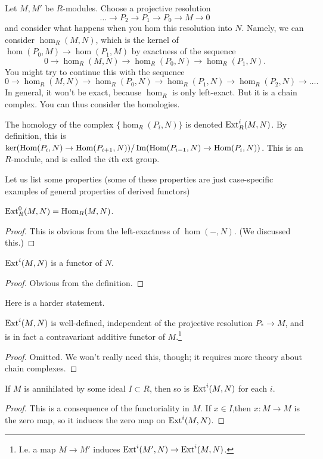 Let $M, M'$ be $R$-modules. Choose a projective resolution
\[ \dots \to P_2 \to P_1 \to P_0 \to M \to 0  \]
and consider what happens when you hom this resolution into $N$.
Namely, we can
consider $\hom_R(M,N)$, which is the kernel of $\hom(P_0, M)
\to\hom(P_1, M) $
by exactness of the sequence
\[ 0 \to \hom_R(M,N) \to \hom_R(P_0, N) \to \hom_R(P_1, N) . \]
You might try to continue this with the sequence
\[ 0 \to \hom_R(M,N) \to \hom_R(P_0, N) \to \hom_R(P_1, N) \to
\hom_R(P_2, N)
\to \dots. \]
In general, it won't be exact, because $\hom_R$ is only
left-exact. But it is a
chain complex. You can thus consider the homologies.

\begin{definition}
The homology of the complex $\{\hom_R(P_i, N)\}$ is denoted
$\operatorname{Ext}^i_R(M,N)$. By
definition, this is $\ker(\operatorname{Hom}(P_i,N) \to \operatorname{Hom}(P_{i+1},
N))/\operatorname{Im}(\operatorname{Hom}(P_{i-1},
N) \to \operatorname{Hom}(P_i,N))$. This is an $R$-module, and is called the
$i$th ext group.
\end{definition}



Let us list some properties (some of these properties are just
case-specific examples of general properties of derived
functors)

\begin{proposition}
$\operatorname{Ext}_R^0(M,N) = \operatorname{Hom}_R(M,N)$.
\end{proposition}
\begin{proof}
This is obvious from the left-exactness of $\hom(-,N)$. (We
discussed this.)
\end{proof}

\begin{proposition}
$\operatorname{Ext}^i(M,N)$ is a functor of $N$.
\end{proposition}
\begin{proof}
Obvious from the definition.
\end{proof}

Here is a harder statement.
\begin{proposition}
$\operatorname{Ext}^i(M,N)$ is well-defined, independent of the projective
resolution $P_*
\to M$, and is in fact a contravariant additive functor of
$M$.\footnote{I.e. a map $M
\to M'$ induces $\operatorname{Ext}^i(M', N) \to \operatorname{Ext}^i(M,N)$.}
\end{proposition}
\begin{proof}
Omitted. We won't really need this, though; it requires more
theory about
chain complexes.
\end{proof}


\begin{proposition}
If $M$ is annihilated by some ideal $I \subset R$, then so is
$\operatorname{Ext}^i(M,N)$ for
each $i$.
\end{proposition}
\begin{proof}
This is a consequence of the functoriality in $M$. If $x \in
I$,then $x: M \to
M$ is the zero map, so it induces the zero map on
$\operatorname{Ext}^i(M,N)$.\end{proof}


